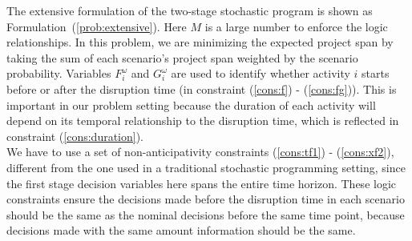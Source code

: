 \documentclass[11pt]{article}
\newcommand{\noi}{\noindent}
\begin{document}
	\noi The extensive formulation of the two-stage stochastic program is shown as Formulation~(\ref{prob:extensive}). Here \(M\) is a large number to enforce the logic relationships. In this problem, we are minimizing the expected project span by taking the sum of each scenario's project span weighted by the scenario probability. Variables \(F^\omega_i\) and \(G^\omega_i\) are used to identify whether activity \(i\) starts before or after the disruption time (in constraint (\ref{cons:f}) - (\ref{cons:fg})). This is important in our problem setting because the duration of each activity will depend on its temporal relationship to the disruption time, which is reflected in constraint (\ref{cons:duration}). \\
	\newline
	We have to use a set of non-anticipativity constraints (\ref{cons:tf1}) - (\ref{cons:xf2}), different from the one used in a traditional stochastic programming setting, since the first stage decision variables here spans the entire time horizon. These logic constraints ensure the decisions made before the disruption time in each scenario should be the same as the nominal decisions before the same time point, because decisions made with the same amount information should be the same.\\
\end{document}
